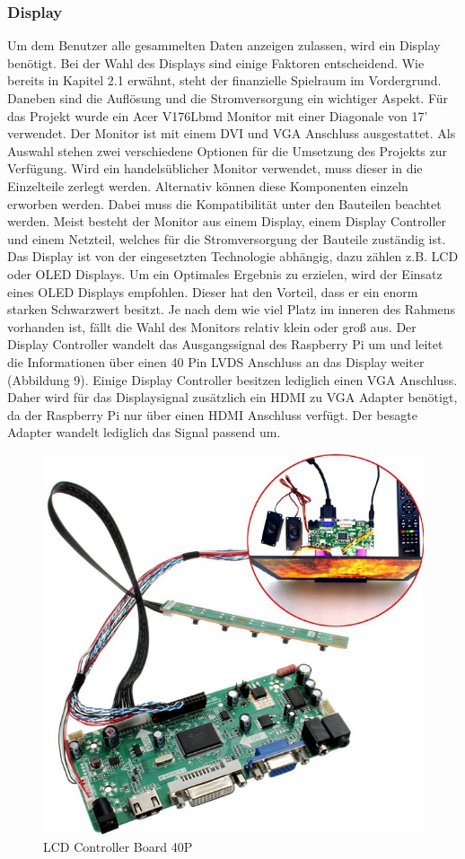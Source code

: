 \subsubsection{Display}
Um dem Benutzer alle gesammelten Daten anzeigen zulassen, wird ein Display benötigt. Bei der Wahl des Displays sind einige Faktoren entscheidend. Wie bereits in Kapitel 2.1 erwähnt, steht der finanzielle Spielraum im Vordergrund. Daneben sind die Auflösung und die Stromversorgung ein wichtiger Aspekt. Für das Projekt wurde ein Acer V176Lbmd Monitor mit einer Diagonale von 17' verwendet. Der Monitor ist mit einem DVI und VGA Anschluss ausgestattet. Als Auswahl stehen zwei verschiedene Optionen für die Umsetzung des Projekts zur Verfügung. Wird ein handelsüblicher Monitor verwendet, muss dieser in die Einzelteile zerlegt werden. Alternativ können diese Komponenten einzeln erworben werden. Dabei muss die Kompatibilität unter den Bauteilen beachtet werden.  Meist besteht der Monitor aus einem Display, einem Display Controller und einem Netzteil, welches für die Stromversorgung der Bauteile zuständig ist. Das Display ist von der eingesetzten Technologie abhängig, dazu zählen z.B. LCD oder OLED Displays. Um ein Optimales Ergebnis zu erzielen, wird der Einsatz eines OLED Displays empfohlen. Dieser hat den Vorteil, dass er ein enorm starken Schwarzwert besitzt. Je nach dem wie viel Platz im inneren des Rahmens vorhanden ist, fällt die Wahl des Monitors relativ klein oder groß aus. Der Display Controller wandelt das Ausgangssignal des Raspberry Pi um und leitet die Informationen über einen 40 Pin LVDS Anschluss an das Display weiter (Abbildung 9). Einige Display Controller besitzen lediglich einen VGA Anschluss. Daher wird für das Displaysignal zusätzlich ein HDMI zu VGA Adapter benötigt, da der Raspberry Pi nur über einen HDMI Anschluss verfügt. Der besagte Adapter wandelt lediglich das Signal passend um.
\begin{figure}[H]
	\includegraphics[trim=0mm 0mm 0mm 0mm, scale=1]{bilder/dcontroller.jpg}
	\caption{LCD Controller Board 40P}
\end{figure}

